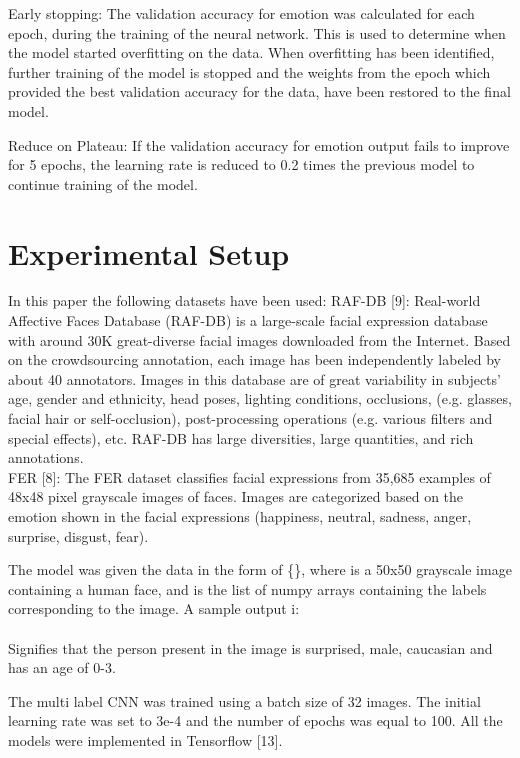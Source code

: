 \documentclass[letterpaper,10pt]{article}
\begin{document}
Early stopping: The validation accuracy for emotion was calculated for each epoch, during the training of the neural network. This is used to determine when the model started overfitting on the data. When overfitting has been identified, further training of the model is stopped and the weights from the epoch which provided the best validation accuracy for the data, have been restored to the final model.

Reduce on Plateau: If the validation accuracy for emotion output fails to improve for 5 epochs, the learning rate is reduced to 0.2 times the previous model to continue training of the model.

\section{Experimental Setup}
In this paper the following datasets have been used:
RAF-DB [9]: Real-world Affective Faces Database (RAF-DB) is a large-scale facial expression database with around 30K great-diverse facial images downloaded from the Internet. Based on the crowdsourcing annotation, each image has been independently labeled by about 40 annotators. Images in this database are of great variability in subjects' age, gender and ethnicity, head poses, lighting conditions, occlusions, (e.g. glasses, facial hair or self-occlusion), post-processing operations (e.g. various filters and special effects), etc. RAF-DB has large diversities, large quantities, and rich annotations.\\
FER [8]: The FER dataset classifies facial expressions from 35,685 examples of 48x48 pixel grayscale images of faces. Images are categorized based on the emotion shown in the facial expressions (happiness, neutral, sadness, anger, surprise, disgust, fear).

The model was given the data in the form of \{\}, where  is a 50x50 grayscale image containing a human face, and  is the list of numpy arrays containing the labels corresponding to the image.
A sample output i:\\
\\
Signifies that the person present in the image is surprised, male, caucasian and has an age of 0-3.

The multi label CNN was trained using a batch size of 32 images.
The initial learning rate was set to 3e-4 and the number of epochs was equal to 100.
All the models were implemented in Tensorflow [13].
\end{document}
